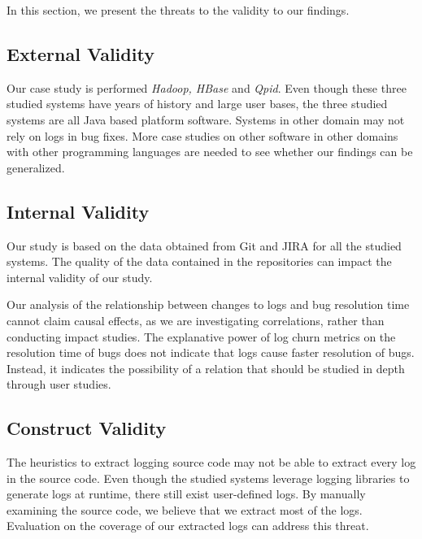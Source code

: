 
In this section, we present the threats to the validity to our findings.

\subsection*{External Validity}


Our case study is performed \emph{Hadoop, HBase} and \emph{Qpid}.  Even though these three studied systems have years of history and large user bases, the three studied systems are all Java based platform software. Systems in other domain may not rely on logs in bug fixes. More case studies on other software in other domains with other programming languages are needed to see whether our findings can be generalized. 




\subsection*{Internal Validity}


Our study is based on the data obtained from Git and JIRA for all the studied systems. The quality of the data contained in the repositories can impact the internal validity of our study.

Our analysis of the relationship between changes to logs and bug resolution time cannot claim causal effects, as we are investigating correlations, rather than conducting impact studies. The explanative power of log churn metrics on the resolution time of bugs does not indicate that logs cause faster resolution of bugs. Instead, it indicates the possibility of a relation that should be studied in depth through user studies.


\subsection*{Construct Validity}

The heuristics to extract logging source code may not be able to extract every log in the source code. Even though the studied systems leverage logging libraries to generate logs at runtime, there still exist user-defined logs. By manually examining the source code, we believe that we extract most of the logs. Evaluation on the coverage of our extracted logs can address this threat.

